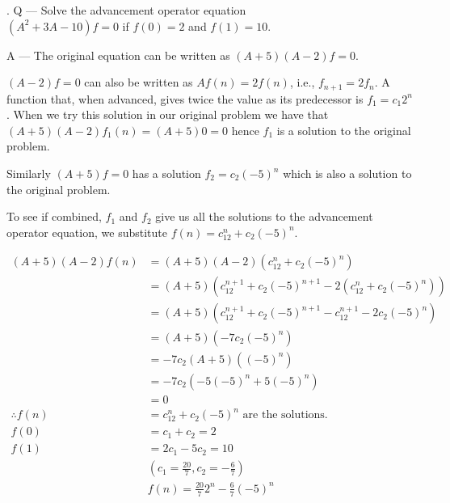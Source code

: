 \documentclass{article}
\newcounter{question}
\begin{document}
\newcommand\Que[1]{%
   \leavevmode\par
   \stepcounter{question}
   \noindent
   \thequestion. Q --- #1\par}

\newcommand\Ans[2][]{%
    \leavevmode\par\noindent
   {\leftskip37pt
    A --- \textbf{#1}#2\par}}

\Que{
    Solve the advancement operator equation\\
    $(A^2+3 A-10)f=0$ if $f(0)=2$
    and $f(1)=10$.
}
\Ans{
    The original equation can be written as $(A+5)(A-2)f=0$.

    $(A-2)f=0$ can also be written as $Af(n) = 2f(n)$, i.e.,
    $f_{n+1}=2f_n$. A function that, when advanced,
    gives twice the value as its predecessor is $f_1=c_1{2^n}$.
    When we try this solution in our original problem we have that
    $(A+5)(A-2)f_1(n) = (A+5)0 = 0$ hence $f_1$ is a solution
    to the original problem.

    Similarly $(A+5)f=0$ has a solution
    $f_2=c_2(-5)^n$ which is also a solution
    to the original problem.

    To see if combined, $f_1$ and $f_2$ give us
    all the solutions to the advancement operator
    equation, we substitute $f(n) = c_12^n + c_2(-5)^n$.

    \begin{align*}
        (A+5)(A-2)f(n) &= (A+5)(A-2)(c_12^n + c_2(-5)^n)\\
        & = (A+5)(
            c_12^{n+1} + c_2(-5)^{n+1}
            - 2(c_12^n + c_2(-5)^n)
            )\\
        & = (A+5)(
            c_12^{n+1} + c_2(-5)^{n+1}
            - c_12^{n+1} - 2c_2(-5)^n
            )\\
        & = (A+5)(
            -7c_2(-5)^n
            )\\
        & = -7c_2(A+5)((-5)^n)\\
        & = -7c_2(-5(-5)^{n} + 5(-5)^{n})\\
        & = 0\\
        \therefore
        f(n) & = c_12^n + c_2(-5)^n \text{ are the solutions.}\\
        f(0) & = c_1 + c_2 = 2\\
        f(1) & = 2c_1 - 5c_2 = 10\\
        & (c_1 = \frac{20}{7}, c_2 = -\frac{6}{7})\\
        & \boxed{f(n) = \frac{20}{7}2^n - \frac{6}{7}(-5)^n}
    \end{align*}

}
\end{document}
